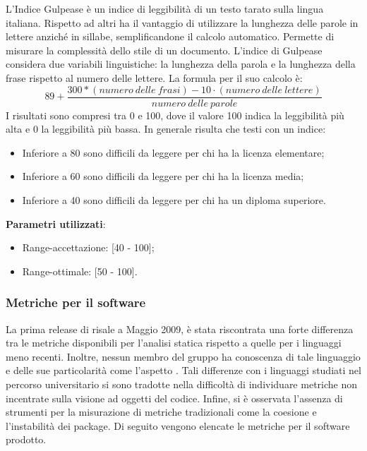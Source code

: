 			L'Indice Gulpease è un indice di leggibilità di un testo tarato sulla lingua italiana. Rispetto ad altri ha il vantaggio di utilizzare la lunghezza delle parole in lettere anziché in sillabe, semplificandone il calcolo automatico. Permette di misurare la complessità dello stile di un documento.
			L'indice di Gulpease considera due variabili linguistiche: la lunghezza della parola e la lunghezza della frase rispetto al numero delle lettere.
			La formula per il suo calcolo è: \\
			$$
			89 + \frac{300 * (numero\ delle\ frasi) - 10 \cdot (numero\ delle\ lettere)}{numero\ delle\ parole}
			$$
			I risultati sono compresi tra 0 e 100, dove il valore 100 indica la leggibilità più alta e 0 la leggibilità più bassa. In generale risulta che testi con un indice:
			\begin{itemize}
				\item Inferiore a 80 sono difficili da leggere per chi ha la licenza elementare;
				\item Inferiore a 60 sono difficili da leggere per chi ha la licenza media;
				\item Inferiore a 40 sono difficili da leggere per chi ha un diploma superiore.
			\end{itemize}
			\textbf{Parametri utilizzati}:
			\begin{itemize}
				\item Range-accettazione: [40 - 100];
				\item Range-ottimale: [50 - 100].
			\end{itemize}
			
		\subsubsection{Metriche per il software}

		La prima release di  risale a Maggio 2009, è stata riscontrata una forte differenza tra le metriche disponibili per l'analisi statica rispetto a quelle per i linguaggi meno recenti. Inoltre, nessun membro del gruppo ha conoscenza di tale linguaggio e delle sue particolarità come l'aspetto . Tali differenze con i linguaggi studiati nel percorso universitario si sono tradotte nella difficoltà di individuare metriche non incentrate sulla visione ad oggetti del codice. Infine, si è osservata l'assenza di strumenti per la misurazione di metriche tradizionali come la coesione e l'instabilità dei package.
		Di seguito vengono elencate le metriche per il software prodotto.
		
